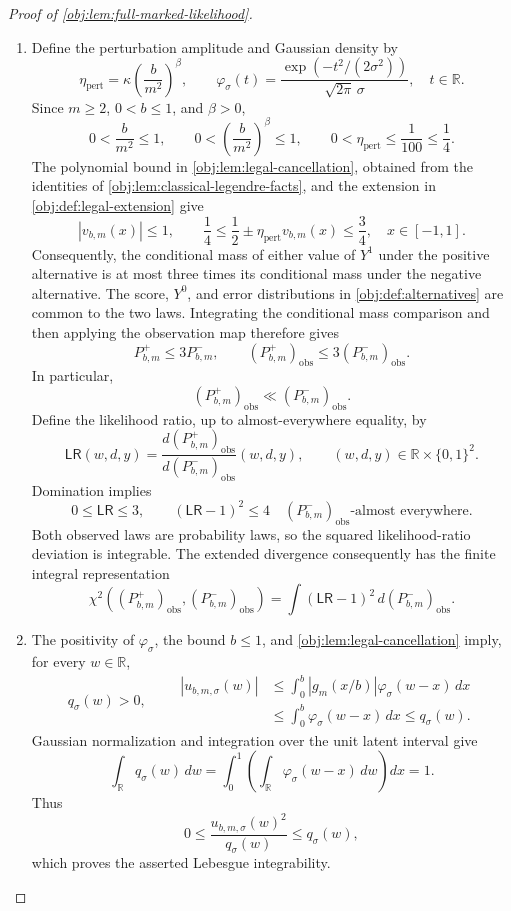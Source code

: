 \begin{proof}[Proof of \cref{obj:lem:full-marked-likelihood}]
\begin{enumerate}
\item Define the perturbation amplitude and Gaussian density by
\[
\eta_{\mathrm{pert}}
=\kappa\left(\frac{b}{m^2}\right)^\beta,
\qquad
\varphi_\sigma(t)
=\frac{\exp(-t^2/(2\sigma^2))}{\sqrt{2\pi}\,\sigma},
\quad t\in\mathbb R.
\]
Since \(m\ge2\), \(0<b\le1\), and \(\beta>0\),
\[
0<\frac{b}{m^2}\le1,
\qquad
0<\left(\frac{b}{m^2}\right)^\beta\le1,
\qquad
0<\eta_{\mathrm{pert}}\le\frac1{100}\le\frac14.
\]
The polynomial bound in \cref{obj:lem:legal-cancellation}, obtained from the identities of \cref{obj:lem:classical-legendre-facts}, and the extension in \cref{obj:def:legal-extension} give
\[
|v_{b,m}(x)|\le1,
\qquad
\frac14\le\frac12\pm\eta_{\mathrm{pert}}v_{b,m}(x)\le\frac34,
\quad x\in[-1,1].
\]
Consequently, the conditional mass of either value of \(Y^1\) under the positive alternative is at most three times its conditional mass under the negative alternative. The score, \(Y^0\), and error distributions in \cref{obj:def:alternatives} are common to the two laws. Integrating the conditional mass comparison and then applying the observation map therefore gives
\[
P^+_{b,m}\le3P^-_{b,m},
\qquad
(P^+_{b,m})_{\mathrm{obs}}
\le3(P^-_{b,m})_{\mathrm{obs}}.
\]
In particular,
\[
(P^+_{b,m})_{\mathrm{obs}}
\ll(P^-_{b,m})_{\mathrm{obs}}.
\]
Define the likelihood ratio, up to almost-everywhere equality, by
\[
\mathsf{LR}(w,d,y)
=
\frac{d(P^+_{b,m})_{\mathrm{obs}}}
     {d(P^-_{b,m})_{\mathrm{obs}}}(w,d,y),
\qquad
(w,d,y)\in\mathbb R\times\{0,1\}^2.
\]
Domination implies
\[
0\le\mathsf{LR}\le3,
\qquad
(\mathsf{LR}-1)^2\le4
\quad
(P^-_{b,m})_{\mathrm{obs}}\text{-almost everywhere}.
\]
Both observed laws are probability laws, so the squared likelihood-ratio deviation is integrable. The extended divergence consequently has the finite integral representation
\[
\chi^2\!\left((P^+_{b,m})_{\mathrm{obs}},
             (P^-_{b,m})_{\mathrm{obs}}\right)
=
\int(\mathsf{LR}-1)^2\,d(P^-_{b,m})_{\mathrm{obs}}.
\]

\item The positivity of \(\varphi_\sigma\), the bound \(b\le1\), and \cref{obj:lem:legal-cancellation} imply, for every \(w\in\mathbb R\),
\[
q_\sigma(w)>0,
\qquad
\begin{aligned}
|u_{b,m,\sigma}(w)|
&\le\int_0^b |g_m(x/b)|\varphi_\sigma(w-x)\,dx\\
&\le\int_0^b\varphi_\sigma(w-x)\,dx
\le q_\sigma(w).
\end{aligned}
\]
Gaussian normalization and integration over the unit latent interval give
\[
\int_{\mathbb R}q_\sigma(w)\,dw
=
\int_0^1\left(\int_{\mathbb R}\varphi_\sigma(w-x)\,dw\right)dx
=1.
\]
Thus
\[
0\le
\frac{u_{b,m,\sigma}(w)^2}{q_\sigma(w)}
\le q_\sigma(w),
\]
which proves the asserted Lebesgue integrability.


\end{enumerate}
\end{proof}
